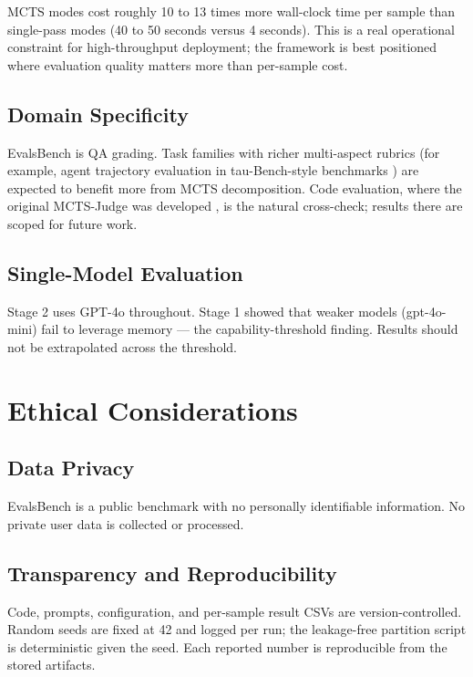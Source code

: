 \documentclass[12pt,a4paper]{report}
\begin{document}
MCTS modes cost roughly 10 to 13 times more wall-clock time per sample than single-pass modes (40 to 50 seconds versus 4 seconds). This is a real operational constraint for high-throughput deployment; the framework is best positioned where evaluation quality matters more than per-sample cost.

\subsection{Domain Specificity}

EvalsBench is QA grading. Task families with richer multi-aspect rubrics (for example, agent trajectory evaluation in tau-Bench-style benchmarks \cite{tau_knowledge2026}) are expected to benefit more from MCTS decomposition. Code evaluation, where the original MCTS-Judge was developed \cite{mcts_judge2025}, is the natural cross-check; results there are scoped for future work.

\subsection{Single-Model Evaluation}

Stage 2 uses GPT-4o throughout. Stage 1 showed that weaker models (gpt-4o-mini) fail to leverage memory --- the capability-threshold finding. Results should not be extrapolated across the threshold.

\section{Ethical Considerations}

\subsection{Data Privacy}

EvalsBench is a public benchmark with no personally identifiable information. No private user data is collected or processed.

\subsection{Transparency and Reproducibility}

Code, prompts, configuration, and per-sample result CSVs are version-controlled. Random seeds are fixed at 42 and logged per run; the leakage-free partition script is deterministic given the seed. Each reported number is reproducible from the stored artifacts.
\end{document}
